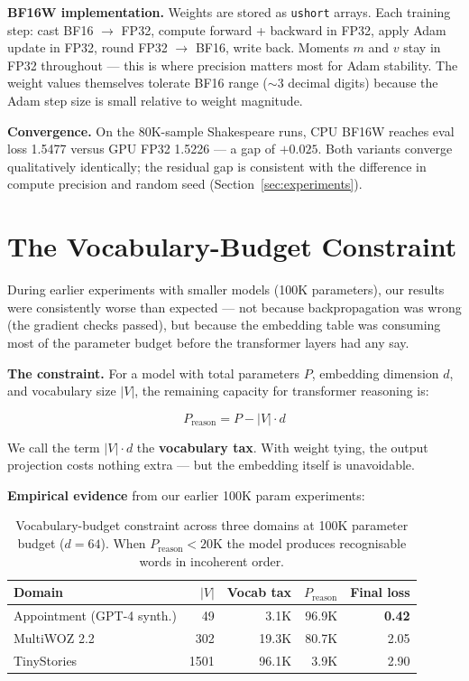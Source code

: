 \documentclass[11pt]{article}
\begin{document}
\textbf{BF16W implementation.} Weights are stored as \texttt{ushort} arrays.
Each training step: cast BF16 $\to$ FP32, compute forward + backward in FP32,
apply Adam update in FP32, round FP32 $\to$ BF16, write back.
Moments $m$ and $v$ stay in FP32 throughout --- this is where precision matters most
for Adam stability. The weight values themselves tolerate BF16 range ($\sim$3 decimal
digits) because the Adam step size is small relative to weight magnitude.

\textbf{Convergence.} On the 80K-sample Shakespeare runs, CPU BF16W
reaches eval loss 1.5477 versus GPU FP32 1.5226 --- a gap of $+0.025$.
Both variants converge qualitatively identically; the residual gap is consistent
with the difference in compute precision and random seed (Section~\ref{sec:experiments}).

\section{The Vocabulary-Budget Constraint}

\label{sec:vocab}

During earlier experiments with smaller models (100K parameters), our results were
consistently worse than expected --- not because backpropagation was wrong (the
gradient checks passed), but because the embedding table was consuming most of the
parameter budget before the transformer layers had any say.

\textbf{The constraint.} For a model with total parameters $P$, embedding dimension
$d$, and vocabulary size $|V|$, the remaining capacity for transformer reasoning is:

\begin{equation}
P_{\text{reason}} = P - |V| \cdot d
\label{eq:vocab-budget}
\end{equation}

We call the term $|V| \cdot d$ the \textbf{vocabulary tax}. With weight tying, the
output projection costs nothing extra --- but the embedding itself is unavoidable.

\textbf{Empirical evidence} from our earlier 100K param experiments:

\begin{table}[ht]
\centering
\begin{tabular}{lrrrr}
\toprule
Domain & $|V|$ & Vocab tax & $P_\text{reason}$ & Final loss \\
\midrule
Appointment (GPT-4 synth.) & 49   & 3.1K  & 96.9K & \textbf{0.42} \\
MultiWOZ 2.2               & 302  & 19.3K & 80.7K & 2.05 \\
TinyStories                & 1501 & 96.1K & 3.9K  & 2.90 \\
\bottomrule
\end{tabular}
\caption{Vocabulary-budget constraint across three domains at 100K parameter budget
($d{=}64$). When $P_\text{reason} < 20$K the model produces recognisable words in
incoherent order.}
\label{tab:vocab-budget}
\end{table}
\end{document}
